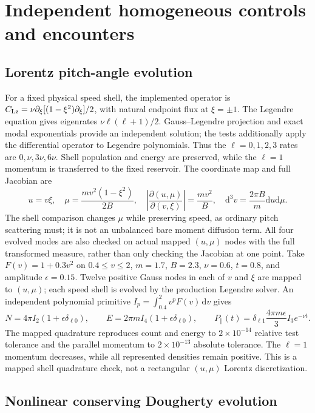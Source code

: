 \documentclass[11pt,letterpaper]{article}
\newcommand{\dd}{\mathrm d}
\begin{document}
\section{Independent homogeneous controls and encounters}

\subsection*{Lorentz pitch-angle evolution}

For a fixed physical speed shell, the implemented operator is
$C_{\rm Lz}=\nu\partial_\xi[(1-\xi^2)\partial_\xi]/2$, with natural endpoint
flux at $\xi=\pm1$. The Legendre equation gives eigenrates
$\nu\ell(\ell+1)/2$. Gauss--Legendre projection and exact modal exponentials
provide an independent solution; the tests additionally apply the differential
operator to Legendre polynomials. Thus the $\ell=0,1,2,3$ rates are
$0,\nu,3\nu,6\nu$. Shell population and energy are preserved, while the
$\ell=1$ momentum is transferred to the fixed reservoir.
The coordinate map and full Jacobian are
\begin{equation}
 u=v\xi,\quad \mu=\frac{m v^2(1-\xi^2)}{2B},\quad
 \left|\frac{\partial(u,\mu)}{\partial(v,\xi)}\right|=\frac{m v^2}{B},\quad
 \dd^3v=\frac{2\pi B}{m}\dd u\dd\mu.
\end{equation}
The shell comparison changes $\mu$ while preserving speed, as ordinary pitch
scattering must; it is not an unbalanced bare moment diffusion term.
All four evolved modes are also checked on actual mapped $(u,\mu)$ nodes with
the full transformed measure, rather than only checking the Jacobian at one
point. Take $F(v)=1+0.3v^2$ on $0.4\le v\le2$, $m=1.7$, $B=2.3$,
$\nu=0.6$, $t=0.8$, and amplitude $\epsilon=0.15$. Twelve positive Gauss nodes
in each of $v$ and $\xi$ are mapped to $(u,\mu)$; each speed shell is evolved
by the production Legendre solver. An independent polynomial primitive
$I_p=\int_{0.4}^{2}v^pF(v)\,\dd v$ gives
\[
 N=4\pi I_2(1+\epsilon\delta_{\ell0}),\qquad
 E=2\pi mI_4(1+\epsilon\delta_{\ell0}),\qquad
 P_\parallel(t)=\delta_{\ell1}\frac{4\pi m\epsilon}{3}I_3e^{-\nu t}.
\]
The mapped quadrature reproduces count and energy to $2\times10^{-14}$
relative test tolerance and the parallel momentum to $2\times10^{-13}$
absolute tolerance. The $\ell=1$ momentum decreases, while all represented
densities remain positive. This is a mapped shell quadrature check, not a
rectangular $(u,\mu)$ Lorentz discretization.

\subsection*{Nonlinear conserving Dougherty evolution}
\end{document}
